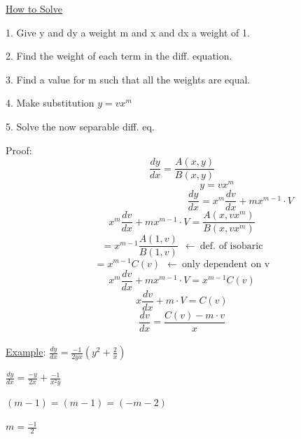 \documentclass[12pt]{article}
\numberwithin{equation}{subsection}
\newcommand{\derx}[1]{\frac{d #1}{dx}}
\newcommand{\deryx}{\frac{dy}{dx}}
\newcommand{\indd}{\hspace{2cm}}
\begin{document}
\noindent \underline{How to Solve}

1. Give y and dy a weight m and x and dx a weight of 1.

2. Find the weight of each term in the diff. equation.

3. Find a value for m such that all the weights are equal.

4. Make substitution $y=vx^m$

5. Solve the now separable diff. eq.

\newpage

Proof:
\begin{equation}
\deryx = \frac{A(x,y)}{B(x,y)} \tag{1.7.2}
\end{equation}
\begin{equation}
\hspace{3cm} y=vx^m
\end{equation}
\begin{equation}
\hspace{5cm} \deryx= x^m \derx{v}+ mx^{m-1} \cdot V
\end{equation}
\begin{equation}
x^m \derx{v}+ mx^{m-1} \cdot V =\frac{A(x,vx^m)}{B(x,vx^m)}
\end{equation}
\begin{equation}
=x^{m-1}\frac{A(1,v)}{B(1,v)} \ \   \leftarrow \  \textrm{def. of isobaric}
\end{equation}
\begin{equation}
=x^{m-1}C(v) \ \   \leftarrow \  \textrm{only dependent on v}
\end{equation}
\begin{equation}
x^m \derx{v}+ mx^{m-1} \cdot V = x^{m-1}C(v)
\end{equation}
\begin{equation}
 x \derx{v}+ m \cdot V =C(v)
\end{equation}
\begin{equation}
\derx{v}=\frac{C(v)-m\cdot v}{x}
\end{equation}\\

\noindent \underline{Example}: \hspace{1cm}$\displaystyle \deryx = \frac{-1}{2yx}\left( y^2 + \frac{2}{x} \right)$\\
 \bigskip

\indd $\displaystyle \deryx = \frac{-y}{2x} + \frac{-1}{x^2y} $

\indd $(m-1)=(m-1)= (-m-2)$

\indd $m=\frac{-1}{2}$
\end{document}
